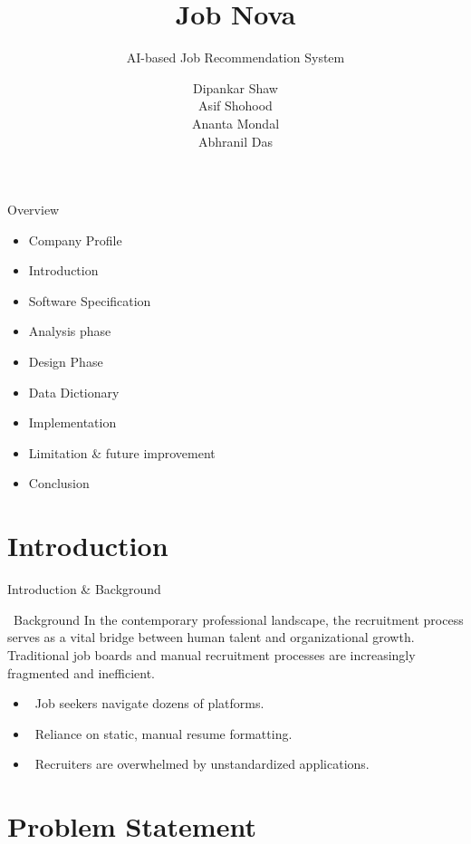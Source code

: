 \documentclass[aspectratio=169]{beamer}
\title{Job Nova}
\subtitle{AI-based Job Recommendation System}
\author{Dipankar Shaw \\ Asif Shohood \\ Ananta Mondal \\ Abhranil Das}
\begin{document}
\maketitle

\begin{frame}{Overview}
    \begin{itemize}
        \setlength{\itemsep}{0.3cm}
        \item Company Profile
        \item Introduction
        \item Software Specification
        \item Analysis phase
        \item Design Phase
        \item Data Dictionary
        \item Implementation
        \item Limitation \& future improvement
        \item Conclusion
    \end{itemize}
\end{frame}

\section{Introduction}

\begin{frame}{Introduction \& Background}
    \begin{block}{\faInfoCircle\ Background}
        In the contemporary professional landscape, the recruitment process serves as a vital bridge between human talent and organizational growth. Traditional job boards and manual recruitment processes are increasingly fragmented and inefficient.
    \end{block}
    
    \vspace{0.3cm}
    \begin{itemize}
        \item \faSearch\ Job seekers navigate dozens of platforms.
        \item \faFileAlt\ Reliance on static, manual resume formatting.
        \item \faUsers\ Recruiters are overwhelmed by unstandardized applications.
    \end{itemize}
\end{frame}

\section{Problem Statement}
\end{document}
